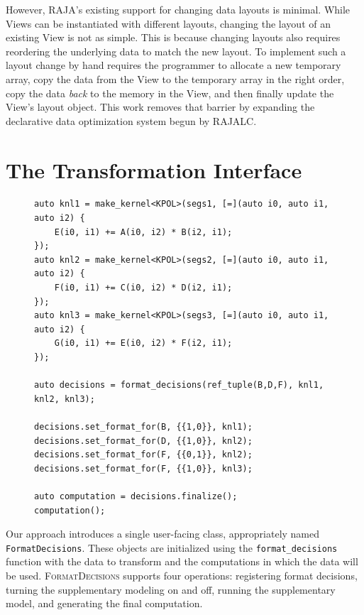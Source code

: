 \documentclass[sigconf,review=true]{acmart}
\newcommand{\FormatDecisions}[0]{{\textsc{FormatDecisions}}}
\begin{document}
However, RAJA's existing support for changing data layouts is minimal. 
While Views can be instantiated with different layouts, changing the layout of an existing View is not as simple.
This is because changing layouts also requires reordering the underlying data to match the new layout. 
To implement such a layout change by hand requires the programmer to allocate a new temporary array, 
copy the data from the View to the temporary array in the right order, 
copy the data \textit{back} to the memory in the View, 
and then finally update the View's layout object.
This work removes that barrier by expanding the declarative data optimization system begun by RAJALC.

\section{The Transformation Interface}


\begin{figure}
\begin{lstlisting}[caption={Changing data layouts in the 3MM benchmark using \FormatDecisions.},
	label={FormatDecisions3MM}]
auto knl1 = make_kernel<KPOL>(segs1, [=](auto i0, auto i1, auto i2) {
	E(i0, i1) += A(i0, i2) * B(i2, i1);
});
auto knl2 = make_kernel<KPOL>(segs2, [=](auto i0, auto i1, auto i2) {
	F(i0, i1) += C(i0, i2) * D(i2, i1);
});
auto knl3 = make_kernel<KPOL>(segs3, [=](auto i0, auto i1, auto i2) {
	G(i0, i1) += E(i0, i2) * F(i2, i1);
});

auto decisions = format_decisions(ref_tuple(B,D,F), knl1, knl2, knl3);

decisions.set_format_for(B, {{1,0}}, knl1);
decisions.set_format_for(D, {{1,0}}, knl2);
decisions.set_format_for(F, {{0,1}}, knl2);
decisions.set_format_for(F, {{1,0}}, knl3);

auto computation = decisions.finalize();
computation();
\end{lstlisting}
\end{figure}
Our approach introduces a single user-facing class, appropriately named \verb.FormatDecisions..
These objects are initialized using the \verb.format_decisions. function with the data to transform and the computations in which the data will be used.
\FormatDecisions{} supports four operations: registering format decisions, turning the supplementary modeling on and off, running the supplementary model, and generating the final computation.
\end{document}
